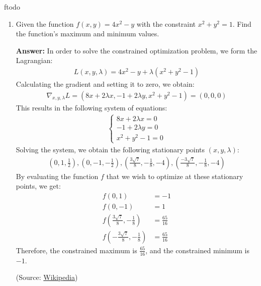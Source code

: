 ƒtodo\documentclass{article}
\newenvironment{QandA}{\begin{enumerate}[label=\arabic*.]}{\end{enumerate}}
\newenvironment{answer}{\par\normalfont \textbf{Answer:}}{}
\begin{document}
\begin{QandA}
    \item Given the function $f(x, y) = 4x^2 - y$ with the constraint $x^2 + y^2 = 1$. Find the function's maximum and minimum values. 
    \begin{answer}
        In order to solve the constrained optimization problem, we form the Lagrangian:
        \begin{align*}
            L(x, y, \lambda) = 4x^2 - y + \lambda(x^2 + y^2 - 1)
        \end{align*}
        Calculating the gradient and setting it to zero, we obtain:
        \begin{align*}
            \nabla_{x, y, \lambda}L = \left( 8x + 2\lambda x, -1 + 2 \lambda y, x^2 + y^2 -1 \right) = (0, 0, 0)
        \end{align*}
        This results in the following system of equations:
        \begin{align*}
            \begin{cases}
                8x + 2\lambda x = 0 \\
                -1 + 2 \lambda y = 0 \\
                x^2 + y^2 - 1 = 0
            \end{cases}
        \end{align*}
        Solving the system, we obtain the following stationary points $(x, y, \lambda)$:
        \begin{align*}
            \left(0, 1, \frac{1}{2} \right), \left(0, -1, -\frac{1}{2} \right),  \left(\frac{3\sqrt{7}}{8}, -\frac{1}{8}, -4 \right),  \left(\frac{-3\sqrt{7}}{8}, -\frac{1}{8}, -4 \right)
        \end{align*}
        By evaluating the function $f$ that we wish to optimize at these stationary points, we get:
        \begin{align*}
            f \left(0, 1\right) &= -1 \\
            f \left(0, -1\right) &= 1 \\
            f \left(\frac{3\sqrt{7}}{8}, -\frac{1}{8}\right) &= \frac{65}{16} \\
            f \left(-\frac{3\sqrt{7}}{8}, -\frac{1}{8}\right) &= \frac{65}{16} 
        \end{align*}
        Therefore, the constrained maximum is $\frac{65}{16}$, and the constrained minimum is $-1$.
        
        (Source: \href{https://en.wikipedia.org/wiki/Lagrange_multiplier}{Wikipedia})
    \end{answer}
\end{QandA}
\end{document}
